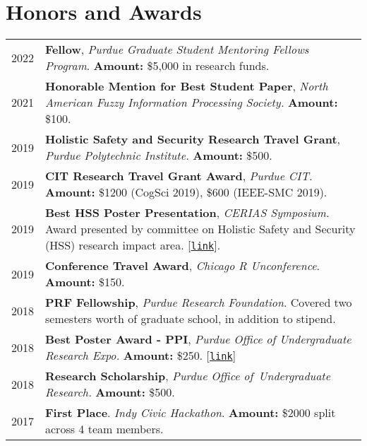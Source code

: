 \documentclass[11pt]{article}
\newcommand{\link}[1]{[\href{#1}{\texttt{link}}]}
\begin{document}
\section*{Honors and Awards}
\vspace{-1.5em}
\renewcommand*{\arraystretch}{1.5}
\begin{longtable}{p{}  p{} }
2022 & \textbf{Fellow}, \textit{Purdue Graduate Student Mentoring Fellows Program}. \textbf{Amount:} \$5{,}000 in research funds.\\
2021 & \textbf{Honorable Mention for Best Student Paper}, \textit{North American Fuzzy Information Processing Society.} \textbf{Amount:} \$100.\\
2019 & \textbf{Holistic Safety and Security Research Travel Grant}, \textit{Purdue Polytechnic Institute.} \textbf{Amount:} \$500.\\
2019 & \textbf{CIT Research Travel Grant Award}, \textit{Purdue CIT.} \textbf{Amount:} \$1200 (CogSci 2019), \$600 (IEEE-SMC 2019).\\
2019 & \textbf{Best HSS Poster Presentation}, \textit{CERIAS Symposium.} Award presented by committee on Holistic Safety and Security (HSS) research impact area. \link{https://polytechnic.purdue.edu/office-of-research/impact-areas/holistic-safety-and-security/cerias-poster-session}.\\
2019 & \textbf{Conference Travel Award}, \textit{Chicago R Unconference}. \textbf{Amount:} \$150.\\
2018 & \textbf{PRF Fellowship}, \textit{Purdue Research Foundation}. Covered two semesters worth of graduate school, in addition to stipend.\\
2018 & \textbf{Best Poster Award - PPI}, \textit{Purdue Office of Undergraduate Research Expo.} \textbf{Amount:} \$250. \link{https://www.purdue.edu/undergrad-research/conferences/spring/archive/past-winners.php}\\
2018 & \textbf{Research Scholarship}, \textit{Purdue Office of~Undergraduate Research.} \textbf{Amount:} \$500.\\
2017 & \textbf{First Place}. \textit{Indy Civic Hackathon}. \textbf{Amount:} \$2000 split across 4 team members.
\end{longtable}

\renewcommand*{\arraystretch}{1}
\end{document}
